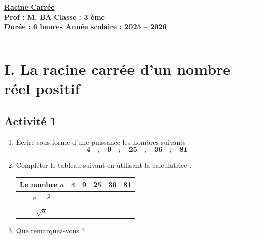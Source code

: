 \documentclass[12pt,a4paper]{article}
\begin{document}
\begin{center}
    \Large\textbf{\underline{\textcolor{myred}{Racine Carrée}}}\\[0.2cm]
    \normalsize\textbf{Prof : M. BA} \hfill \textbf{Classe : 3 ème}\\[0.1cm]
    \textbf{Durée : 6 heures} \hfill \textbf{Année scolaire : 2025 -- 2026}
\end{center}
\hrule
\vspace{0.3cm}

\section*{\color{myred}I. La racine carrée d'un nombre réel positif}

\subsection*{\color{myred} Activité 1}
\begin{enumerate}[label=\textbf{\arabic*.}]
    \item Écrire sous forme d'une puissance les nombres suivants :
    \[
    \mathbf{4 \quad ; \quad 9 \quad ; \quad 25 \quad ; \quad 36 \quad ; \quad 81}
    \]

    \item Compléter le tableau suivant en utilisant la calculatrice :
    
    \vspace{0.3cm}
    \begin{center}
    \renewcommand{\arraystretch}{1.8}
    \begin{tabular}{|c|c|c|c|c|c|}
        \hline
        Le nombre $a$ & 4 & 9 & 25 & 36 & 81 \\ \hline
        $a = \square^2$ & \hspace{1cm} & \hspace{1cm} & \hspace{1cm} & \hspace{1cm} & \hspace{1cm} \\ \hline
        $\sqrt{a}$ & & & & & \\ \hline
    \end{tabular}
    \end{center}
    \vspace{0.3cm}

    \item Que remarquez-vous ?
\end{enumerate}
\end{document}
